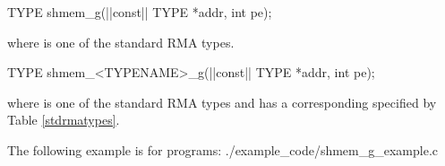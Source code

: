 
\begin{apidefinition}

\begin{C11synopsis}
TYPE shmem_g(|\aftergroup{}|const|\aftergroup\prevcolor| TYPE *addr, int pe);
\end{C11synopsis}
where \TYPE{} is one of the standard \ac{RMA} types.

\begin{Csynopsis}
TYPE shmem_<TYPENAME>_g(|\aftergroup{}|const|\aftergroup\prevcolor| TYPE *addr, int pe);
\end{Csynopsis}
where \TYPE{} is one of the standard \ac{RMA} types and has a corresponding \TYPENAME{} specified by Table \ref{stdrmatypes}.

\begin{apiarguments}
\end{apiarguments}




\begin{apiexamples}

\apicexample
    {The following  example is for \CorCpp{} programs:}
    {./example_code/shmem_g_example.c}
    {}
\end{apiexamples}

\end{apidefinition}
